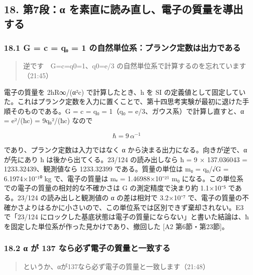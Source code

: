 \documentclass[
  a4paper,
]{ltjsarticle}
\begin{document}
\subsection{18. 第7段：α
を素直に読み直し、電子の質量を導出する}\label{ux7b2c7ux6bb5ux3b1-ux3092ux7d20ux76f4ux306bux8aadux307fux76f4ux3057ux96fbux5b50ux306eux8ceaux91cfux3092ux5c0eux51faux3059ux308b}

\subsubsection{18.1 G = c = q₀ = 1
の自然単位系：プランク定数は出力である}\label{g-c-qux2080-1-ux306eux81eaux7136ux5358ux4f4dux7cfbux30d7ux30e9ux30f3ux30afux5b9aux6570ux306fux51faux529bux3067ux3042ux308b}

\begin{quote}
逆です　G=c=q0=1、q0=e/3 の自然単位系で計算するのを忘れています（21:45）
\end{quote}

電子の質量を 2hR∞/(α²c) で計算したとき、h を SI
の定義値として固定していた。これはプランク定数を入力に置くことで、第十四思考実験が最初に退けた手順そのものである。G
= c = q₀ = 1（q₀ = e/3、ガウス系）で計算し直すと、α = e²/(ħc) =
9q₀²/(ħc) なので

\[
\hbar=9\,\alpha^{-1}
\]

であり、プランク定数は入力ではなく α から決まる出力になる。向きが逆で、α
が先にあり ħ は後から出てくる。23/124 の読み出しなら ħ = 9 × 137.036043
= 1233.32439、観測値なら 1233.32399 である。質量の単位は m₀ = q₀/√G =
6.1974×10⁻¹⁰ kg で、電子の質量は mₑ = 1.46988×10⁻²¹ m₀
になる。この単位系での電子の質量の相対的な不確かさは G
の測定精度で決まり約 1.1×10⁻⁵ である。23/124 の読み出しと観測値の α
の差は相対で 3.2×10⁻⁷
で、電子の質量の不確かさよりはるかに小さいので、この単位系では区別できず棄却されない。E3
で「23/124 にロックした基底状態は電子の質量にならない」と書いた結論は、ħ
を固定した単位系が作った見かけであり、撤回した {[}A2 第6節・第23節{]}。

\subsubsection{18.2 α が 137
なら必ず電子の質量と一致する}\label{ux3b1-ux304c-137-ux306aux3089ux5fc5ux305aux96fbux5b50ux306eux8ceaux91cfux3068ux4e00ux81f4ux3059ux308b}

\begin{quote}
というか、αが137なら必ず電子の質量と一致します（21:48）
\end{quote}
\end{document}
